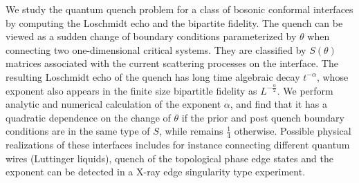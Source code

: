 
We study the quantum quench problem for a class of bosonic conformal interfaces by computing the Loschmidt echo and the bipartite fidelity. The quench can be viewed as a sudden change of boundary conditions parameterized by $\theta$ when connecting two one-dimensional critical systems. They are classified by $S(\theta)$ matrices associated with the current scattering processes on the interface. The resulting Loschmidt echo of the quench has long time algebraic decay $t^{-\alpha}$, whose exponent also appears in the finite size bipartitle fidelity as $L^{-\frac{\alpha}{2}}$. We perform analytic and numerical calculation of the exponent $\alpha$, and find that it has a quadratic dependence on the change of $\theta$ if the prior and post quench boundary conditions are in the same type of $S$, while remains $\frac{1}{4}$ otherwise. Possible physical realizations of these interfaces includes for instance connecting different quantum wires (Luttinger liquids), quench of the topological phase edge states \etc and the exponent can be detected in a X-ray edge singularity type experiment. 


